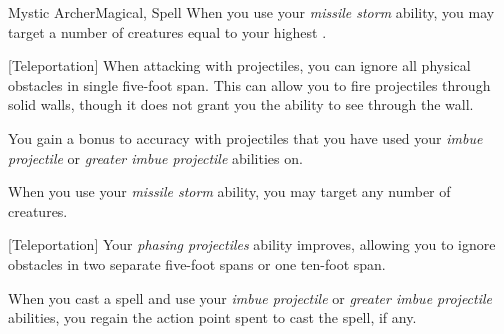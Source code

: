 \begin{feat}{Mystic Archer}{Magical, Spell}
         When you use your \textit{missile storm} ability, you may target a number of creatures equal to your highest .

        [Teleportation] When attacking with projectiles, you can ignore all physical obstacles in single five-foot span.
        This can allow you to fire projectiles through solid walls, though it does not grant you the ability to see through the wall.

         You gain a  bonus to accuracy with projectiles that you have used your \textit{imbue projectile} or \textit{greater imbue projectile} abilities on.

         When you use your \textit{missile storm} ability, you may target any number of creatures.

        [Teleportation] Your \textit{phasing projectiles} ability improves, allowing you to ignore obstacles in two separate five-foot spans or one ten-foot span.

         When you cast a spell and use your \textit{imbue projectile} or \textit{greater imbue projectile} abilities, you regain the action point spent to cast the spell, if any.
    \end{feat}

